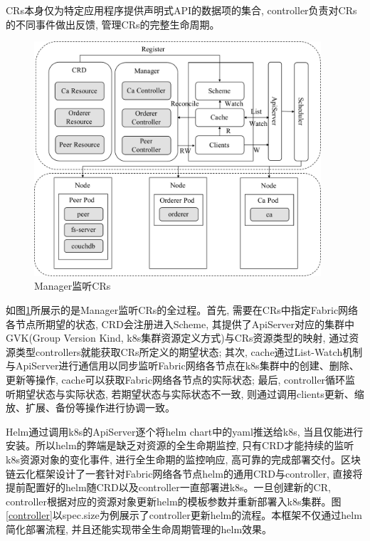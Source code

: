 CRs本身仅为特定应用程序提供声明式API的数据项的集合, controller负责对CRs的不同事件做出反馈, 管理CRs的完整生命周期。

\begin{figure}[h] %
    \centering %
    \includegraphics[width=0.95\textwidth]{FIGs/chapter3/manager.pdf} %
    \caption{Manager监听CRs} %
    \label{manager} %
\end{figure}%

如图\ref{manager}所展示的是Manager监听CRs的全过程。首先, 需要在CRs中指定Fabric网络各节点所期望的状态, CRD会注册进入Scheme, 其提供了ApiServer对应的集群中GVK(Group Version Kind, k8s集群资源定义方式)与CRs资源类型的映射, 通过资源类型controllers就能获取CRs所定义的期望状态; 其次, cache通过List-Watch机制与ApiServer进行通信用以同步监听Fabric网络各节点在k8s集群中的创建、删除、更新等操作, cache可以获取Fabric网络各节点的实际状态; 最后, controller循环监听期望状态与实际状态, 若期望状态与实际状态不一致, 则通过调用clients更新、缩放、扩展、备份等操作进行协调一致。

Helm通过调用k8s的ApiServer逐个将helm chart中的yaml推送给k8s, 当且仅能进行安装。所以helm的弊端是缺乏对资源的全生命期监控, 只有CRD才能持续的监听k8s资源对象的变化事件, 进行全生命期的监控响应, 高可靠的完成部署交付。区块链云化框架设计了一套针对Fabric网络各节点helm的通用CRD与controller, 直接将提前配置好的helm随CRD以及controller一直部署进k8s。一旦创建新的CR, controller根据对应的资源对象更新helm的模板参数并重新部署入k8s集群。图\ref{controller}以spec.size为例展示了controller更新helm的流程。本框架不仅通过helm简化部署流程, 并且还能实现带全生命周期管理的helm效果。

